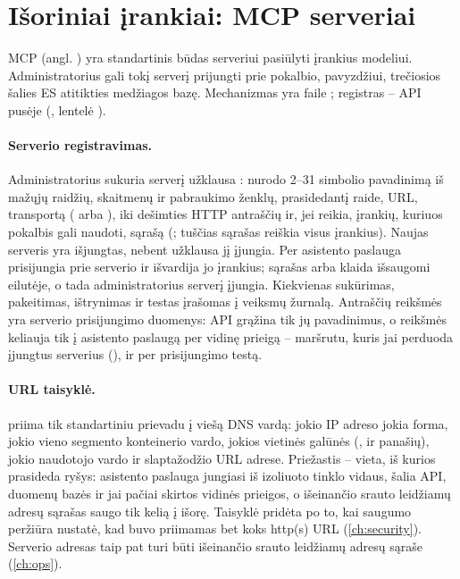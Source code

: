 \section{Išoriniai įrankiai: MCP serveriai}\label{sec:chat:mcp}

MCP (angl. ) yra standartinis būdas serveriui pasiūlyti įrankius
modeliui. Administratorius gali tokį serverį prijungti prie pokalbio, pavyzdžiui, trečiosios
šalies ES atitikties medžiagos bazę. Mechanizmas yra faile ; registras -- API pusėje
(, lentelė ).

\paragraph{Serverio registravimas.} Administratorius sukuria serverį užklausa
: nurodo 2--31 simbolio pavadinimą iš mažųjų raidžių, skaitmenų ir
pabraukimo ženklų, prasidedantį raide, URL, transportą ( arba ), iki dešimties
HTTP antraščių ir, jei reikia, įrankių, kuriuos pokalbis gali naudoti, sąrašą
(; tuščias sąrašas reiškia visus įrankius). Naujas serveris yra išjungtas,
nebent užklausa jį įjungia. Per  asistento paslauga
prisijungia prie serverio ir išvardija jo įrankius; sąrašas arba klaida išsaugomi eilutėje, o
tada administratorius serverį įjungia. Kiekvienas sukūrimas, pakeitimas, ištrynimas ir testas
įrašomas į veiksmų žurnalą. Antraščių reikšmės yra serverio prisijungimo duomenys: API grąžina
tik jų pavadinimus, o reikšmės keliauja tik į asistento paslaugą per vidinę prieigą -- maršrutu,
kuris jai perduoda įjungtus serverius (), ir per
prisijungimo testą.

\paragraph{URL taisyklė.}  priima tik  standartiniu prievadu į viešą
DNS vardą: jokio IP adreso jokia forma, jokio vieno segmento konteinerio vardo, jokios vietinės
galūnės (,  ir panašių), jokio naudotojo vardo ir slaptažodžio URL
adrese. Priežastis -- vieta, iš kurios prasideda ryšys: asistento paslauga jungiasi iš izoliuoto
tinklo vidaus, šalia API, duomenų bazės ir jai pačiai skirtos vidinės prieigos, o išeinančio
srauto leidžiamų adresų sąrašas saugo tik kelią į išorę. Taisyklė pridėta po to, kai saugumo
peržiūra nustatė, kad buvo priimamas bet koks http(s) URL (\cref{ch:security}). Serverio adresas
taip pat turi būti išeinančio srauto leidžiamų adresų sąraše (\cref{ch:ops}).

